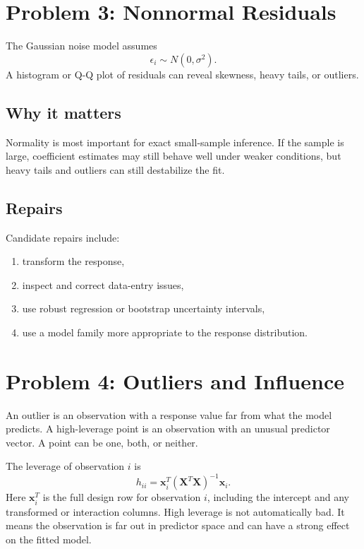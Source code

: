 \section{Problem 3: Nonnormal Residuals}

The Gaussian noise model assumes
\begin{equation}
  \epsilon_i\sim N(0,\sigma^2).
\end{equation}
A histogram or Q-Q plot of residuals can reveal skewness, heavy tails, or outliers.

\subsection*{Why it matters}

Normality is most important for exact small-sample inference.  If the sample is large, coefficient estimates may still behave well under weaker conditions, but heavy tails and outliers can still destabilize the fit.

\subsection*{Repairs}

Candidate repairs include:
\begin{enumerate}
  \item transform the response,
  \item inspect and correct data-entry issues,
  \item use robust regression or bootstrap uncertainty intervals,
  \item use a model family more appropriate to the response distribution.
\end{enumerate}

\section{Problem 4: Outliers and Influence}

An outlier is an observation with a response value far from what the model predicts.  A high-leverage point is an observation with an unusual predictor vector.  A point can be one, both, or neither.

The leverage of observation \(i\) is
\begin{equation}
  h_{ii}=\mathbf{x}_i^T(\mathbf{X}^T\mathbf{X})^{-1}\mathbf{x}_i.
\end{equation}
Here \(\mathbf{x}_i^T\) is the full design row for observation \(i\), including the intercept and any transformed or interaction columns.  High leverage is not automatically bad.  It means the observation is far out in predictor space and can have a strong effect on the fitted model.

